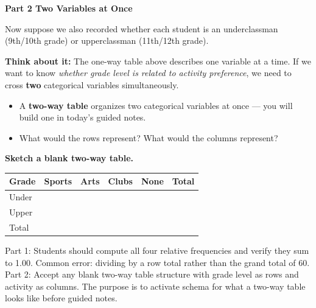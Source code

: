 \documentclass[10pt]{article}
\begin{document}
\vspace{0.3in}

{\large\bfseries\color{navy} Part 2 \quad Two Variables at Once}

\vspace{0.12in}

\noindent Now suppose we also recorded whether each student is an underclassman
(9th/10th grade) or upperclassman (11th/12th grade).

\vspace{0.14in}

\begin{tcolorbox}[colback=greenbg, colframe=greenacc, boxrule=0.8pt, arc=2mm,
    left=4mm, right=4mm, top=3mm, bottom=3mm]
    \small
    \textbf{Think about it:} The one-way table above describes one variable at a time.
    If we want to know \emph{whether grade level is related to activity preference},
    we need to cross \textbf{two} categorical variables simultaneously.
    \begin{itemize}[leftmargin=1.3em, itemsep=6pt]
        \item A \textbf{two-way table} organizes two categorical variables at once
              --- you will build one in today's guided notes.
        \item What would the rows represent? What would the columns represent?
    \end{itemize}
\end{tcolorbox}

\vspace{0.16in}

\noindent\textbf{Sketch a blank two-way table.}

\vspace{0.15in}

\renewcommand{\arraystretch}{2.2}
\begin{tabularx}{\linewidth}{@{} l Y Y Y Y Y @{}}
\textbf{Grade} & \textbf{Sports} & \textbf{Arts} & \textbf{Clubs} & \textbf{None} & \textbf{Total} \\
\hline
Under          & \ans{} & \ans{} & \ans{} & \ans{} & \ans{} \\
Upper          & \ans{} & \ans{} & \ans{} & \ans{} & \ans{} \\
\hline
Total          & \ans{} & \ans{} & \ans{} & \ans{} & \ans{} \\
\end{tabularx}

\begin{teachernote}
Part 1: Students should compute all four relative frequencies and verify they sum to 1.00.
Common error: dividing by a row total rather than the grand total of 60.
Part 2: Accept any blank two-way table structure with grade level as rows and activity as columns.
The purpose is to activate schema for what a two-way table looks like before guided notes.
\end{teachernote}
\end{document}

